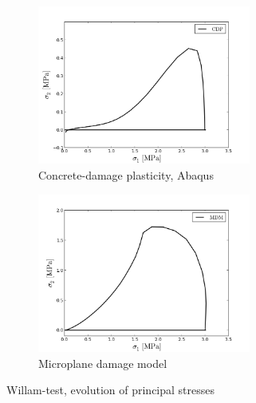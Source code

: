 \documentclass[main.tex]{subfiles}
\begin{document}
\begin{figure} 
    \centering
    \begin{subfigure}[b]{0.4\textwidth}
        \includegraphics[width=7cm]{fig/WillamTest-Sig1-Sig2-CDP.png}
        \caption{Concrete-damage plasticity, Abaqus}
        \label{FIGWillamTestThetaCDP}
    \end{subfigure}
    \begin{subfigure}[b]{0.4\textwidth}
        \includegraphics[width=7cm]{fig/WillamTest-Sig1-Sig2-MDM.png}
        \caption{Microplane damage model}
        \label{FIGWillamTestThetaMDM}
    \end{subfigure}
    \caption{Willam-test, evolution of principal stresses}
\end{figure}
\end{document}
